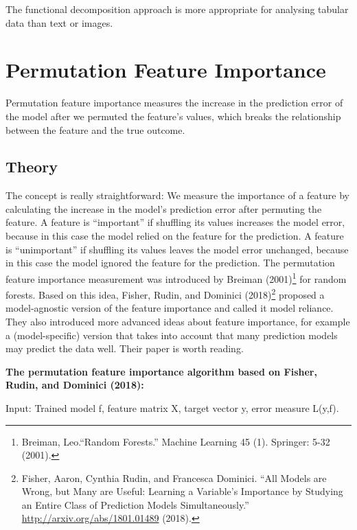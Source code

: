 \documentclass[
  12pt,
]{krantz}
\begin{document}
The functional decomposition approach is more appropriate for analysing tabular data than text or images.

\newpage

\hypertarget{feature-importance}{%
\section{Permutation Feature Importance}\label{feature-importance}}

Permutation feature importance measures the increase in the prediction error of the model after we permuted the feature's values, which breaks the relationship between the feature and the true outcome.

\hypertarget{theory-3}{%
\subsection{Theory}\label{theory-3}}

The concept is really straightforward:
We measure the importance of a feature by calculating the increase in the model's prediction error after permuting the feature.
A feature is ``important'' if shuffling its values increases the model error, because in this case the model relied on the feature for the prediction.
A feature is ``unimportant'' if shuffling its values leaves the model error unchanged, because in this case the model ignored the feature for the prediction.
The permutation feature importance measurement was introduced by Breiman (2001)\footnote{Breiman, Leo.``Random Forests.'' Machine Learning 45 (1). Springer: 5-32 (2001).} for random forests.
Based on this idea, Fisher, Rudin, and Dominici (2018)\footnote{Fisher, Aaron, Cynthia Rudin, and Francesca Dominici. ``All Models are Wrong, but Many are Useful: Learning a Variable's Importance by Studying an Entire Class of Prediction Models Simultaneously.'' \url{http://arxiv.org/abs/1801.01489} (2018).} proposed a model-agnostic version of the feature importance and called it model reliance.
They also introduced more advanced ideas about feature importance, for example a (model-specific) version that takes into account that many prediction models may predict the data well.
Their paper is worth reading.

\textbf{The permutation feature importance algorithm based on Fisher, Rudin, and Dominici (2018):}

Input: Trained model f, feature matrix X, target vector y, error measure L(y,f).
\end{document}
